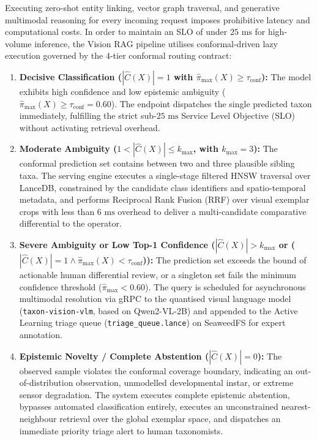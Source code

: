 Executing zero-shot entity linking, vector graph traversal, and generative multimodal reasoning for every incoming request imposes prohibitive latency and computational costs. In order to maintain an SLO of under $25\text{ ms}$ for high-volume inference, the Vision RAG pipeline utilises conformal-driven lazy execution governed by the 4-tier conformal routing contract:
\begin{enumerate}
    \item \textbf{Decisive Classification ($|\hat{C}(X)| = 1$ with $\hat{\pi}_{\max}(X) \ge \tau_{\text{conf}}$):} The model exhibits high confidence and low epistemic ambiguity ($\hat{\pi}_{\max}(X) \ge \tau_{\text{conf}} = 0.60$). The endpoint dispatches the single predicted taxon immediately, fulfilling the strict sub-$25\text{ ms}$ Service Level Objective (SLO) without activating retrieval overhead.
    \item \textbf{Moderate Ambiguity ($1 < |\hat{C}(X)| \le k_{\max}$, with $k_{\max} = 3$):} The conformal prediction set contains between two and three plausible sibling taxa. The serving engine executes a single-stage filtered HNSW traversal over LanceDB, constrained by the candidate class identifiers and spatio-temporal metadata, and performs Reciprocal Rank Fusion (RRF) over visual exemplar crops with less than $6\text{ ms}$ overhead to deliver a multi-candidate comparative differential to the operator.
    \item \textbf{Severe Ambiguity or Low Top-1 Confidence ($|\hat{C}(X)| > k_{\max}$ or ($|\hat{C}(X)| = 1 \land \hat{\pi}_{\max}(X) < \tau_{\text{conf}}$)):} The prediction set exceeds the bound of actionable human differential review, or a singleton set fails the minimum confidence threshold ($\hat{\pi}_{\max} < 0.60$). The query is scheduled for asynchronous multimodal resolution via gRPC to the quantised visual language model (\texttt{taxon-vision-vlm}, based on Qwen2-VL-2B) and appended to the Active Learning triage queue (\texttt{triage\_queue.lance}) on SeaweedFS for expert annotation.
    \item \textbf{Epistemic Novelty / Complete Abstention ($|\hat{C}(X)| = 0$):} The observed sample violates the conformal coverage boundary, indicating an out-of-distribution observation, unmodelled developmental instar, or extreme sensor degradation. The system executes complete epistemic abstention, bypasses automated classification entirely, executes an unconstrained nearest-neighbour retrieval over the global exemplar space, and dispatches an immediate priority triage alert to human taxonomists.
\end{enumerate}

